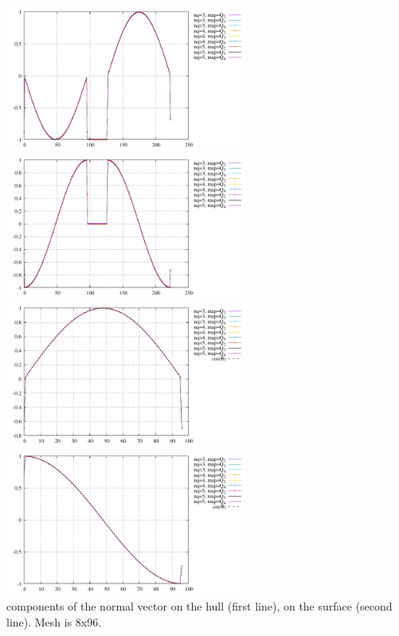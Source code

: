 \begin{center}
\includegraphics[width=8cm]{python_codes/fieldstone_152/results/normals/nx}
\includegraphics[width=8cm]{python_codes/fieldstone_152/results/normals/ny}\\
\includegraphics[width=8cm]{python_codes/fieldstone_152/results/normals/nnx}
\includegraphics[width=8cm]{python_codes/fieldstone_152/results/normals/nny}\\
{\captionfont components of the normal vector on the hull (first line),
on the surface (second line). Mesh is 8x96.}
\end{center}

